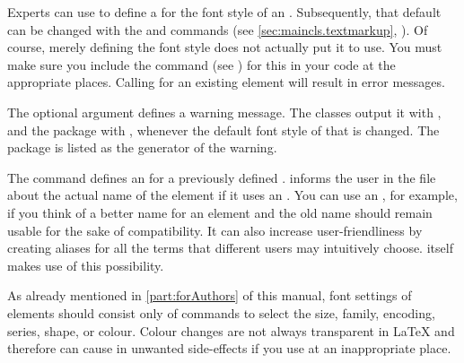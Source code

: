 \begin{Declaration}
\end{Declaration}
Experts can use  to define a  for the font
style of an . Subsequently, that default can be changed with
the  and 
commands (see \autoref{sec:maincls.textmarkup},
). Of course, merely defining the font
style does not actually put it to use. You must make sure you include the
%
 command
(see ) for this  in your
code at the appropriate places. Calling  for an existing
element will result in error messages.

The optional  argument defines a warning message. The
\KOMAScript{} classes output it with , and the
 package with , whenever the default
font style of that  is changed. The package 
is listed as the generator of the warning.

The  command defines an  for a previously
defined . \KOMAScript{} informs the user in the  file
about the actual name of the element if it uses an .
You can use an , for example, if you think of a
better name for an element and the old name should remain usable for the sake
of compatibility. It can also increase user-friendliness by creating aliases
for all the terms that different users may intuitively choose. \KOMAScript{}
itself makes use of this possibility.%
\EndIndexGroup


\begin{Declaration}
\end{Declaration}
As already mentioned in \autoref{part:forAuthors} of this manual, font
settings of elements should consist only of commands to select the size,
family, encoding, series, shape, or colour. Colour changes are not
always transparent in \LaTeX{} and therefore can cause in unwanted side-effects
if you use  at an inappropriate place.

